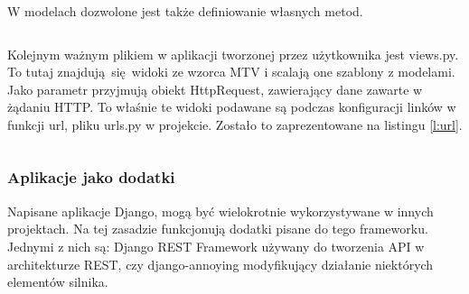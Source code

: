 W modelach dozwolone jest także definiowanie własnych metod.

\begin{singlespace}
	\vspace{0.3cm}
	\inputminted[fontsize=\footnotesize]{python}{src/models.py}
\end{singlespace}

Kolejnym ważnym plikiem w aplikacji tworzonej przez użytkownika jest views.py. To tutaj znajdują się widoki ze wzorca MTV i scalają one szablony z modelami. Jako parametr przyjmują obiekt HttpRequest, zawierający dane zawarte w żądaniu HTTP. To właśnie te widoki podawane są podczas konfiguracji linków w funkcji url, pliku urls.py w projekcie. Zostało to zaprezentowane na listingu \ref{l:url}.

\begin{singlespace}
	\vspace{0.3cm}
	\inputminted[fontsize=\footnotesize]{python}{src/views.py}
\end{singlespace}

\subsubsection*{Aplikacje jako dodatki}
Napisane aplikacje Django, mogą być wielokrotnie wykorzystywane w innych projektach. Na tej zasadzie funkcjonują dodatki pisane do tego frameworku. Jednymi z nich są: Django REST Framework używany do tworzenia API w architekturze REST, czy django-annoying modyfikujący działanie niektórych elementów silnika.

